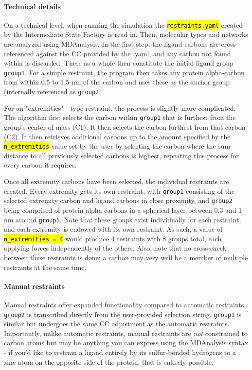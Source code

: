 \documentclass[oneside]{scrreprt}
\newcommand{\code}[1]{\texttt{\hl{#1}}}
\begin{document}
\paragraph{Technical details}
On a technical level, when running the simulation the \code{restraints.yaml} created by the Intermediate State Factory is read in. Then, molecular types and networks are analyzed using MDAnalysis. In the first step, the ligand carbons are cross-referenced against the CC provided by the .yaml, and any carbon not found within is discarded. These as a whole then constitute the initial ligand group \texttt{group1}. For a simple restraint, the program then takes any protein alpha-carbon from within 0.5 to 1.5 nm of the carbon and uses these as the anchor group (internally referenced as \texttt{group2}.

For an "extremities" - type restraint, the process is slightly more complicated. The algorithm first selects the carbon within \texttt{group1} that is furthest from the group's center of mass (C1). It then selects the carbon furthest from that carbon (C2). It then retrieves additional carbons up to the amount specified by the \code{n\_extremities} value set by the user by selecting the carbon where the sum distance to all previously selected carbons is highest, repeating this process for every carbon it requires.

Once all extremity carbons have been selected, the individual restraints are created. Every extremity gets its own restraint, with \texttt{group1} consisting of the selected extremity carbon and ligand carbons in close proximity, and \texttt{group2} being comprised of protein alpha carbons in a spherical layer between 0.3 and 1 nm around \texttt{group1}. Note that these groups exist individually for each restraint, and each extremity is endowed with its own restraint. As such, a value of \code{n\_extremities = 4} would produce 4 restraints with 8 groups total, each applying forces independently of the others. Also, note that no cross-check between these restraints is done; a carbon may very well be a member of multiple restraints at the same time.

\paragraph{Manual restraints}
Manual restraints offer expanded functionality compared to automatic restraints. \texttt{group2} is transcribed directly from the user-provided selection string, \texttt{group1} is similar but undergoes the same CC adjustment as the automatic restraints. Importantly, unlike automatic restraints, manual restraints are \textit{not} constrained to carbon atoms but may be anything you can express using the MDAnalysis syntax - if you'd like to restrain a ligand entirely by its sulfur-bonded hydrogens to a zinc atom on the opposite side of the protein, that is entirely possible.
\end{document}
